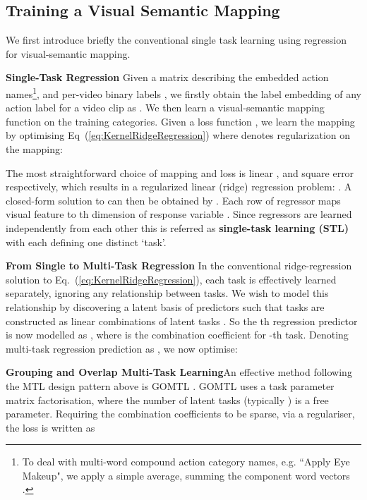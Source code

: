 \documentclass[runningheads]{llncs}
\begin{document}
\subsection{Training a Visual Semantic Mapping}\label{sec:trainMapping}
We first introduce briefly the conventional
single task learning using regression for visual-semantic mapping\cite{dinu2014improving,Xu2015,Fu2015}.

\noindent\textbf{Single-Task Regression}\quad\label{sect:WVEmbedding}
Given a matrix  describing the embedded action
names\footnote{To deal with multi-word compound action category names,
  e.g. ``Apply Eye Makeup", we apply a simple average, 
  summing the component word vectors \cite{Xu2015,Fu2015}.}, and
per-video binary labels , we firstly obtain the label embedding of any
action label for a video clip as . We then learn a
visual-semantic mapping function  on the
training categories.  Given a loss function , we learn
the mapping  by optimising Eq~(\ref{eq:KernelRidgeRegression})
where  denotes  regularization on the mapping:





\noindent The most straightforward choice of mapping  and loss  is
linear , and square error respectively,
which results in a regularized linear (ridge) regression problem:
.
A closed-form solution to  can then be obtained by . Each row  of regressor  maps visual feature  to th dimension of response variable . Since regressors  are learned independently from each other this is referred as \textbf{single-task learning (STL)} with each  defining one distinct `task'.


\noindent\textbf{From Single to Multi-Task Regression}\quad\label{sect:ReducedRankEmbedding}
 In the conventional ridge-regression solution to
 Eq.~(\ref{eq:KernelRidgeRegression}), each task
 is effectively learned
 separately, ignoring any relationship between tasks. We wish to model
 this relationship by discovering a latent basis of 
 predictors such that tasks  are constructed as
 linear combinations of  latent tasks . So the th regression predictor is now modelled as
 , where
  is the combination coefficient for -th
 task. Denoting  multi-task regression prediction as
 , we now optimise:




\noindent\textbf{Grouping and Overlap Multi-Task
  Learning}\quad An effective method following the MTL design pattern
above is GOMTL \cite{Kumar2012}. GOMTL uses a  task parameter
matrix factorisation, where the number of latent tasks  (typically
) is a free parameter. Requiring the combination coefficients
 to be sparse, via a  regulariser, the loss is
written as  
\end{document}
